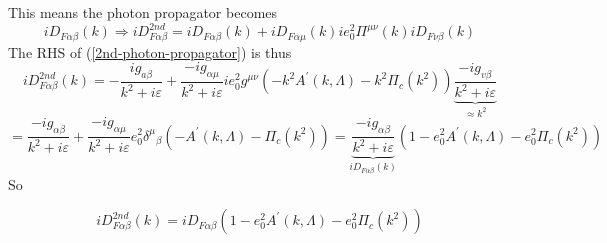  This means the photon propagator becomes
 \begin{equation}i D_{F \alpha \beta}(k) \Rightarrow i D_{F \alpha \beta}^{2 n d}=i D_{F \alpha \beta}(k)+i D_{F \alpha \mu}(k) i e_{0}^{2} \Pi^{\mu \nu}(k) i D_{F \nu \beta}(k)
 \label{2nd-photon-propagator}
 \end{equation}
 The RHS of (\ref{2nd-photon-propagator}) is thus
 $$i D_{F \alpha \beta}^{2 n d}(k)=-\frac{i g_{a \beta}}{k^{2}+i \varepsilon}+\frac{-i g_{\alpha \mu}}{k^{2}+i \varepsilon} i e_{0}^{2} g^{\mu \nu}\left(-k^{2} A^{\prime}(k, \Lambda)-k^{2} \Pi_{c}\left(k^{2}\right)\right)\underbrace{\frac{-i g_{v \beta}}{k^{2}+i \varepsilon}}_{\approx k^{2}}$$
 $$=\frac{-i g_{\alpha \beta}}{k^{2}+i \varepsilon}+\frac{-i g_{\alpha \mu}}{k^{2}+i \varepsilon} e_{0}^{2} \delta^{\mu}{}_\beta\left(-A^{\prime}(k, \Lambda)-\Pi_{c}\left(k^{2}\right)\right)=\underbrace{\frac{-i g_{\alpha \beta}}{k^{2}+i \varepsilon}}_{iD_{F\alpha\beta}(k)}\left(1-e_{0}^{2} A^{\prime}(k, \Lambda)-e_{0}^{2} \Pi_{c}\left(k^{2}\right)\right)
 $$
 So
 \begin{qt}
     \begin{equation}
         iD_{F\alpha\beta}^{2nd}(k)=iD_{F\alpha\beta}\left(1-e_{0}^{2} A^{\prime}(k, \Lambda)-e_{0}^{2} \Pi_{c}\left(k^{2}\right)\right)
     \end{equation}
 \end{qt}
 
